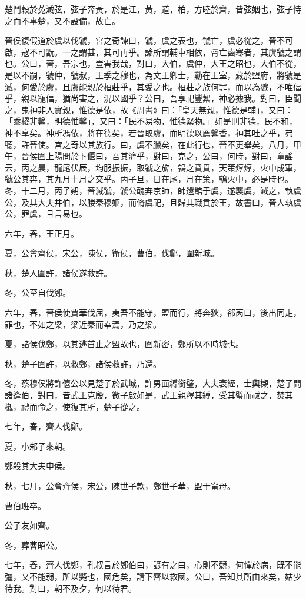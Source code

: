 \begin{pinyinscope}
楚鬥穀於菟滅弦，弦子奔黃，於是江，黃，道，柏，方睦於齊，皆弦姻也，弦子恃之而不事楚，又不設備，故亡。

晉侯復假道於虞以伐虢，宮之奇諫曰，虢，虞之表也，虢亡，虞必從之，晉不可啟，寇不可翫。一之謂甚，其可再乎。諺所謂輔車相依，脣亡齒寒者，其虞虢之謂也。公曰，晉，吾宗也，豈害我哉，對曰，大伯，虞仲，大王之昭也，大伯不從，是以不嗣，虢仲，虢叔，王季之穆也，為文王卿士，勳在王室，藏於盟府，將虢是滅，何愛於虞，且虞能親於桓莊乎，其愛之也。桓莊之族何罪，而以為戮，不唯偪乎，親以寵偪，猶尚害之，況以國乎？公曰，吾享祀豐絜，神必據我。對曰，臣聞之，鬼神非人實親，惟德是依，故《周書》曰：「皇天無親，惟德是輔」，又曰：「黍稷非馨，明德惟馨」，又曰：「民不易物，惟德緊物。」如是則非德，民不和，神不享矣。神所馮依，將在德矣，若晉取虞，而明德以薦馨香，神其吐之乎，弗聽，許晉使。宮之奇以其族行。曰，虞不臘矣，在此行也，晉不更舉矣，八月，甲午，晉侯圍上陽問於卜偃曰，吾其濟乎，對曰，克之，公曰，何時，對曰，童謠云，丙之晨，龍尾伏辰，均服振振，取虢之旂，鶉之賁賁，天策焞焞，火中成軍，虢公其奔，其九月十月之交乎。丙子旦，日在尾，月在策，鶉火中，必是時也。冬，十二月，丙子朔，晉滅虢，虢公醜奔京師，師還館于虞，遂襲虞，滅之，執虞公，及其大夫井伯，以媵秦穆姬，而脩虞祀，且歸其職貢於王，故書曰，晉人執虞公，罪虞，且言易也。

六年，春，王正月。

夏，公會齊侯，宋公，陳侯，衛侯，曹伯，伐鄭，圍新城。

秋，楚人圍許，諸侯遂救許。

冬，公至自伐鄭。

六年，春，晉侯使賈華伐屈，夷吾不能守，盟而行，將奔狄，郤芮曰，後出同走，罪也，不如之梁，梁近秦而幸焉，乃之梁。

夏，諸侯伐鄭，以其逃首止之盟故也，圍新密，鄭所以不時城也。

秋，楚子圍許，以救鄭，諸侯救許，乃還。

冬，蔡穆侯將許僖公以見楚子於武城，許男面縛銜璧，大夫衰絰，士輿櫬，楚子問諸逢伯，對曰，昔武王克殷，微子啟如是，武王親釋其縛，受其璧而祓之，焚其櫬，禮而命之，使復其所，楚子從之。

七年，春，齊人伐鄭。

夏，小邾子來朝。

鄭殺其大夫申侯。

秋，七月，公會齊侯，宋公，陳世子款，鄭世子華，盟于甯母。

曹伯班卒。

公子友如齊。

冬，葬曹昭公。

七年，春，齊人伐鄭，孔叔言於鄭伯曰，諺有之曰，心則不競，何憚於病，既不能彊，又不能弱，所以斃也，國危矣，請下齊以救國。公曰，吾知其所由來矣，姑少待我。對曰，朝不及夕，何以待君。


\end{pinyinscope}
